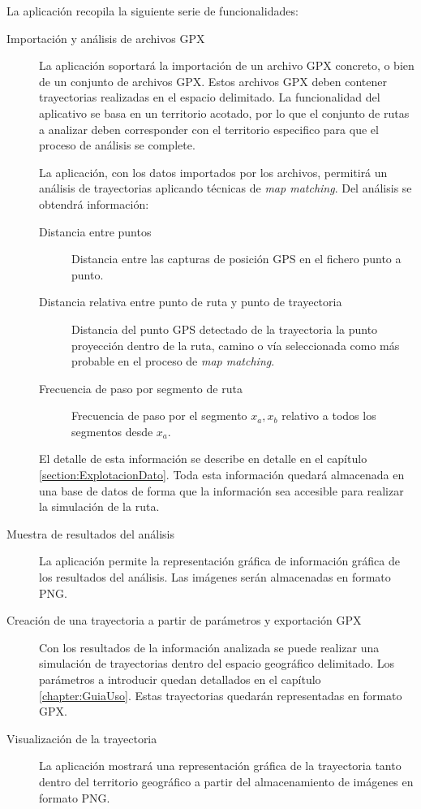 La aplicación recopila la siguiente serie de funcionalidades:
\begin{description}
\item [Importación y análisis de archivos \ac{GPX}] La aplicación soportará la 
importación de un archivo GPX concreto, o bien de un conjunto de archivos GPX. Estos 
archivos GPX deben contener trayectorias realizadas en el espacio delimitado. La 
funcionalidad del aplicativo se basa en un territorio acotado, por lo que el conjunto de 
rutas a analizar deben corresponder con el territorio especifico para que el proceso de 
análisis se complete. 

La aplicación, con los datos importados por los archivos, permitirá un análisis de 
trayectorias aplicando técnicas de \textit{map matching}. Del análisis se obtendrá 
información:
\begin{description} 
\item[Distancia entre puntos]  Distancia entre las capturas de posición \ac{GPS} en el 
fichero punto a punto.
\item[Distancia relativa entre punto de ruta y punto de trayectoria] Distancia del punto 
\ac{GPS} detectado de la trayectoria la punto proyección dentro de la ruta, camino o vía 
seleccionada como más probable en el proceso de \textit{map matching}.
\item[Frecuencia de paso por segmento de ruta] Frecuencia de paso por el segmento 
$x_{a}, x_{b}$ relativo a todos los segmentos desde $x_{a}$.
\end{description}
El detalle de esta información se describe en detalle en el capítulo 
\ref{section:ExplotacionDato}. Toda esta información quedará almacenada en una base 
de datos de forma que la información sea accesible para realizar la simulación de la 
ruta.
\item [Muestra de resultados del análisis] La aplicación permite la representación 
gráfica de información gráfica de los resultados del análisis. Las  imágenes serán 
almacenadas en formato \ac{PNG}.
\item [Creación de una trayectoria a partir de parámetros y exportación \ac{GPX}] Con 
los resultados de la información analizada se puede realizar una simulación de 
trayectorias dentro del espacio geográfico delimitado. Los parámetros a introducir 
quedan detallados en el capítulo \ref{chapter:GuiaUso}. Estas trayectorias quedarán 
representadas en formato \ac{GPX}. 
\item [Visualización de la trayectoria] La aplicación mostrará una representación gráfica 
de la trayectoria tanto   dentro del territorio geográfico a partir del almacenamiento de 
imágenes en formato  \ac{PNG}.
\end{description}


